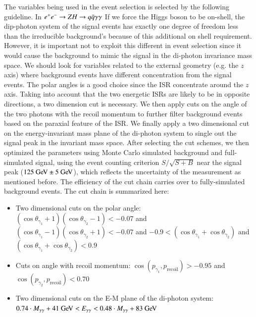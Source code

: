 \documentclass[11pt,a4paper]{cepcnote}
\newcommand{\prcs}{\epem\rightarrow ZH\rightarrow q \bar q\gamma\gamma}
\begin{document}
The variables being used in the event selection is selected by the following guideline. In $\prcs$ If we force the Higgs boson to be on-shell, the dip-photon system of the signal events has exactly one degree of freedom less than the irreducible background's because of this additional on shell requirement. However, it is important not to exploit this different in event selection since it would cause the background to mimic the signal in the di-photon invariance mass space. We should look for variables related to the external geometry (e.g. the $z$ axis) where background events have different concentration from the signal events. The polar angles is a good choice since the ISR concentrate around the $z$ axis. Taking into account that the two energetic ISRs are likely to be in opposite directions, a two dimension cut is necessary. We then apply cuts on the angle of the two photons with the recoil momentum to further filter background events based on the paraxial feature of the ISR. We finally apply a two dimensional cut on the energy-invariant mass plane of the di-photon system to single out the signal peak in the invariant mass space. After selecting the cut schemes, we then optimized the parameters using Monte Carlo simulated background and full-simulated signal, using the event counting criterion $S/\sqrt{S+B}$ near the signal peak ($125\GeV\pm 5\GeV$), which reflects the uncertainty of the measurement as mentioned before. The efficiency of the cut chain carries over to fully-simulated background events. The cut chain is summarized here:
\begin{itemize}
\item Two dimensional cuts on the polar angle: $(\cos\theta_{\gamma_1}+1)(\cos\theta_{\gamma_2}-1) < -0.07$ and $(\cos\theta_{\gamma_1}-1)(\cos\theta_{\gamma_2}+1) < -0.07$ and $-0.9 < (\cos\theta_{\gamma_1}+\cos\theta_{\gamma_2})$ and $(\cos\theta_{\gamma_1}+\cos\theta_{\gamma_2}) < 0.9$
\item Cuts on angle with recoil momentum: $\cos(p_{\gamma_1},p_{\text{recoil}})>-0.95$ and $\cos(p_{\gamma_2},p_{\text{recoil}})<0.70$
\item Two dimensional cuts on the E-M plane of the di-photon system: $0.74\cdot M_{\gamma\gamma}+41\GeV<E_{\gamma\gamma} < 0.48\cdot M_{\gamma\gamma}+83\GeV$
\end{itemize}
\end{document}
